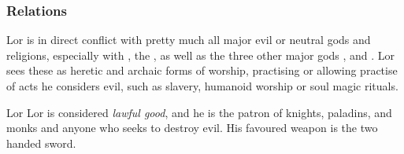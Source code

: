 \subsubsection{Relations}

Lor is in direct conflict with pretty much all major evil or neutral gods and
religions, especially with , the ,
as well as the three other major gods , 
and . Lor sees these as heretic and archaic forms of
worship, practising or allowing practise of acts he considers evil, such as
slavery, humanoid worship or soul magic rituals.

\begin{35e}{Lor}
  Lor is considered \emph{lawful good}, and he is the patron of knights,
  paladins, and monks and anyone who seeks to destroy evil. His favoured
  weapon is the two handed sword.
\end{35e}
